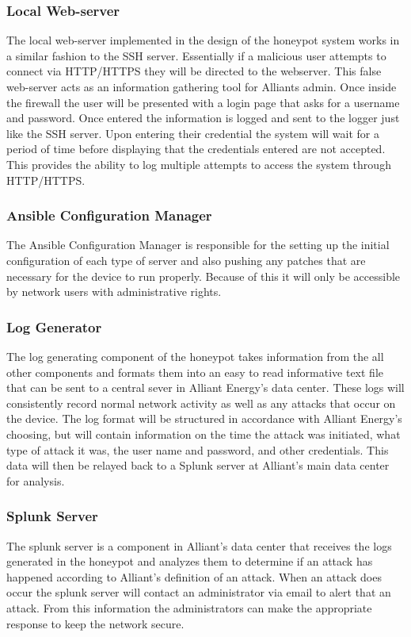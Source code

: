 \subsubsection{Local Web-server}
The local web-server implemented in the design of the honeypot system works in a similar fashion to the SSH server. Essentially if a malicious user attempts to connect via HTTP/HTTPS they will be directed to the webserver.  This false web-server acts as an information gathering tool for Alliants admin.  Once inside the firewall the user will be presented with a login page that asks for a username and password.  Once entered the information is logged and sent to the logger just like the SSH server.  Upon entering their credential the system will wait for a period of time before displaying that the credentials entered are not accepted.  This provides the ability to log multiple attempts to access the system through HTTP/HTTPS.

\subsubsection{Ansible Configuration Manager}
The Ansible Configuration Manager is responsible for the setting up the initial configuration of each type of server and also pushing any patches that are necessary for the device to run properly.  Because of this it will only be accessible by network users with administrative rights.

\subsubsection{Log Generator}
The log generating component of the honeypot takes information from the all other components and formats them into an easy to read informative text file that can be sent to a central sever in Alliant Energy's data center.  These logs will consistently record normal network activity as well as any attacks that occur on the device.  The log format will be structured in accordance with Alliant Energy's choosing, but will contain information on the time the attack was initiated, what type of attack it was, the user name and password, and other credentials.  This data will then be relayed back to a Splunk server at Alliant's main data center for analysis.

\subsubsection{Splunk Server}
The splunk server is a component in Alliant's data center that receives the logs generated in the honeypot and analyzes them to determine if an attack has happened according to Alliant's definition of an attack.  When an attack does occur the splunk server will contact an administrator via email to alert that an attack.  From this information the administrators can make  the appropriate response to keep the network secure.

